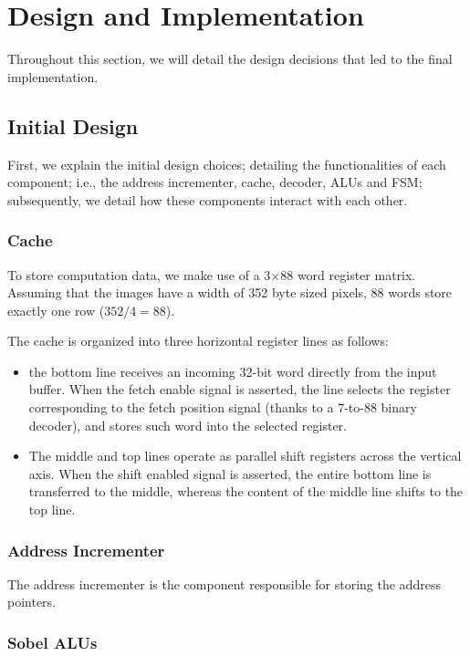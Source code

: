 \section{Design and Implementation}

Throughout this section, we will detail the design decisions that led to the final implementation. 

\subsection{Initial Design}

First, we explain the initial design choices; detailing the functionalities of each component; i.e., the address incrementer, cache, decoder, ALUs and FSM; subsequently, we detail how these components interact with each other.

\subsubsection{Cache}

To store computation data, we make use of a 3$\times$88 word register matrix. Assuming that the images have a width of 352 byte sized pixels, 88 words store exactly one row ($352/4=88$).

The cache is organized into three horizontal register lines as follows:
\begin{itemize}
    \item the bottom line receives an incoming 32-bit word directly from the input buffer. When the fetch enable signal is asserted, the line selects the register corresponding to the fetch position signal (thanks to a 7-to-88 binary decoder), and stores such word into the selected register.
    \item The middle and top lines operate as parallel shift registers across the vertical axis. When the shift enabled signal is asserted, the entire bottom line is transferred to the middle, whereas the content of the middle line shifts to the top line.
\end{itemize}

\subsubsection{Address Incrementer}

The address incrementer is the component responsible for storing the address pointers.

\subsubsection{Sobel ALUs}

